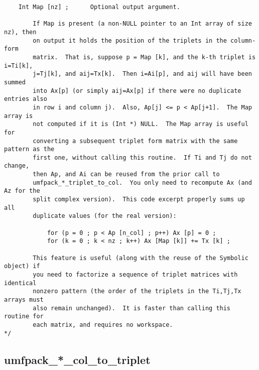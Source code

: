 \documentclass[11pt]{article}
\begin{document}
{\begin{verbatim}
    Int Map [nz] ;      Optional output argument.

        If Map is present (a non-NULL pointer to an Int array of size nz), then
        on output it holds the position of the triplets in the column-form
        matrix.  That is, suppose p = Map [k], and the k-th triplet is i=Ti[k],
        j=Tj[k], and aij=Tx[k].  Then i=Ai[p], and aij will have been summed
        into Ax[p] (or simply aij=Ax[p] if there were no duplicate entries also
        in row i and column j).  Also, Ap[j] <= p < Ap[j+1].  The Map array is
        not computed if it is (Int *) NULL.  The Map array is useful for
        converting a subsequent triplet form matrix with the same pattern as the
        first one, without calling this routine.  If Ti and Tj do not change,
        then Ap, and Ai can be reused from the prior call to
        umfpack_*_triplet_to_col.  You only need to recompute Ax (and Az for the
        split complex version).  This code excerpt properly sums up all
        duplicate values (for the real version):

            for (p = 0 ; p < Ap [n_col] ; p++) Ax [p] = 0 ;
            for (k = 0 ; k < nz ; k++) Ax [Map [k]] += Tx [k] ;

        This feature is useful (along with the reuse of the Symbolic object) if
        you need to factorize a sequence of triplet matrices with identical
        nonzero pattern (the order of the triplets in the Ti,Tj,Tx arrays must
        also remain unchanged).  It is faster than calling this routine for
        each matrix, and requires no workspace.
*/

\end{verbatim}
}

\subsection{umfpack\_*\_col\_to\_triplet}
\end{document}
